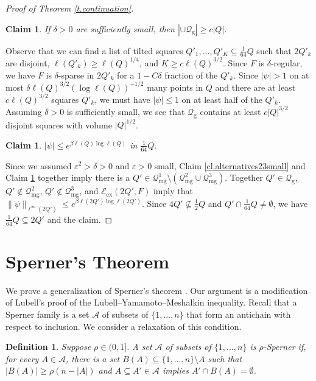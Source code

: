 \documentclass{amsart}
\newtheorem{claim}[equation]{Claim}
\newtheorem{definition}[equation]{Definition}
\newcommand{\tref}[1]{Theorem \ref{t.#1}}
\newcommand{\clref}[1]{Claim \ref{cl.#1}}
\numberwithin{equation}{section}
\numberwithin{figure}{section}
\newcommand{\ep}{\varepsilon}
\begin{document}
\begin{proof}[Proof of \tref{continuation}]
\begin{claim}
\label{cl.lotsofgoodsquares}
If $\delta > 0$ are sufficiently small, then $|\cup \mathcal Q_{\mathrm{g}}| \geq c |Q|$.
\end{claim}

Observe that we can find a list of tilted squares $Q'_1, ..., Q'_K \subseteq \tfrac{1}{64} Q$ such that $2 Q'_k$ are disjoint, $\ell(Q'_k) \geq \ell(Q)^{1/4}$, and $K \geq c \ell(Q)^{3/2}$.  Since $F$ is $\delta$-regular, we have $F$ is $\delta$-sparse in $2 Q'_k$ for a $1-C\delta$ fraction of the $Q'_k$.  Since $|\psi| > 1$ on at most $\delta \ell(Q)^{3/2} (\log \ell(Q))^{-1/2}$ many points in $Q$ and there are at least $c \ell(Q)^{3/2}$ squares $Q'_k$, we must have $|\psi| \leq 1$ on at least half of the $Q'_k$.  Assuming $\delta > 0$ is sufficiently small, we see that $\mathcal Q_{\mathrm{g}}$ contains at least $c |Q|^{3/2}$ disjoint squares with volume $|Q|^{1/2}$.

\begin{claim}
$|\psi| \leq e^{\beta \ell(Q) \log \ell(Q)}$ in $\tfrac{1}{64} Q$.
\end{claim}

Since we assumed $\ep^2 > \delta > 0$ and $\ep > 0$ small, \clref{alternatives23small} and \clref{lotsofgoodsquares} together imply there is a $Q' \in \mathcal Q_{\mathrm{mg}}^1 \setminus (\mathcal Q_{\mathrm{mg}}^2 \cup \mathcal Q_{\mathrm{mg}}^3)$.    Together $Q' \in \mathcal Q_{\mathrm{g}}$, $Q' \notin \mathcal Q_{\mathrm{mg}}^2$, $Q' \notin \mathcal Q_{\mathrm{mg}}^3$, and $\mathcal E_{\mathrm{ex}}(2Q',F)$ imply that $\| \psi \|_{\ell^\infty(2Q')} \leq e^{\beta \ell(2Q') \log \ell(2Q')}$.  Since $4Q' \nsubseteq \tfrac12 Q$ and $Q' \cap \tfrac{1}{64} Q \neq \emptyset$, we have $\tfrac{1}{64} Q \subseteq 2 Q'$ and the claim.
\end{proof}

\section{Sperner's Theorem}

We prove a generalization of Sperner's theorem \cite{Sperner}.  Our argument is a modification of Lubell's proof \cite{Lubell} of the Lubell--Yamamoto--Meshalkin inequality.  Recall that a Sperner family is a set $\mathcal A$ of subsets of $\{ 1, ..., n \}$ that form an antichain with respect to inclusion.  We consider a relaxation of this condition.

\begin{definition}
Suppose $\rho \in (0,1]$.  A set $\mathcal A$ of subsets of $\{ 1, ..., n \}$ is $\rho$-Sperner if, for every $A \in \mathcal A$, there is a set $B(A) \subseteq \{ 1, ..., n \} \setminus A$ such that $|B(A)| \geq \rho (n - |A|)$ and $A \subseteq A' \in \mathcal A$ implies $A' \cap B(A) = \emptyset$.
\end{definition}
\end{document}
